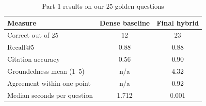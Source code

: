 \begin{table}[!t]
\centering
\footnotesize
\setlength{\tabcolsep}{4pt}
\caption{Part 1 results on our 25 golden questions}
\label{tab:p1}
\begin{tabular}{lcc}
\toprule
Measure & Dense baseline & Final hybrid \\
\midrule
Correct out of 25 & 12 & 23 \\
Recall@5 & 0.88 & 0.88 \\
Citation accuracy & 0.56 & 0.90 \\
Groundedness mean (1--5) & n/a & 4.32 \\
Agreement within one point & n/a & 0.92 \\
Median seconds per question & 1.712 & 0.001 \\
\bottomrule
\end{tabular}
\end{table}
